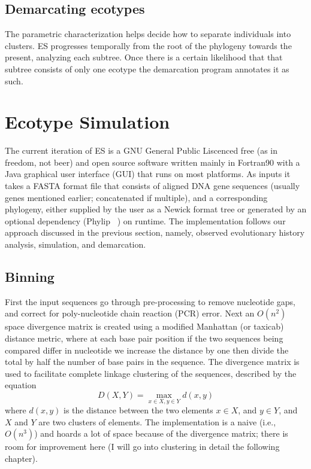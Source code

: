 \subsection*{Demarcating ecotypes}
The parametric characterization helps decide how to separate individuals into clusters.
ES progresses temporally from the root of the phylogeny towards the present, analyzing each subtree.
Once there is a certain likelihood that that subtree consists of only one ecotype the demarcation program annotates it as such.


\section{Ecotype Simulation}
%
%
The current iteration of ES is a GNU General Public Liscenced free (as in freedom, not beer) and open source software written mainly in Fortran90 with a Java graphical user interface (GUI) that runs on most platforms.
As inputs it takes a FASTA format file that consists of aligned DNA gene sequences (usually genes mentioned earlier; concatenated if multiple), and a corresponding phylogeny, either supplied by the user as a Newick format tree or generated by an optional dependency (Phylip ~\cite{felsenstein1989phylip}) on runtime.
The implementation follows our approach discussed in the previous section, namely, observed evolutionary history analysis, simulation, and demarcation.

\subsection*{Binning}
First the input sequences go through pre-processing to remove nucleotide gaps, and correct for poly-nucleotide chain reaction (PCR) error.
Next an $O(n^2)$ space divergence matrix is created using a modified Manhattan (or taxicab) distance metric, where at each base pair position if the two sequences being compared differ in nucleotide we increase the distance by one then divide the total by half the number of base pairs in the sequence.
The divergence matrix is used to facilitate complete linkage clustering of the sequences, described by the equation $$D(X,Y)= \max_{x\in X, y\in Y} d(x,y)$$ where $d(x,y)$ is the distance between the two elements $x \in X$, and $y \in Y$, and $X$ and $Y$ are two clusters of elements.
The implementation is a naive (i.e., $O(n^3)$) and hoards a lot of space because of the divergence matrix; there is room for improvement here (I will go into clustering in detail the following chapter). 

